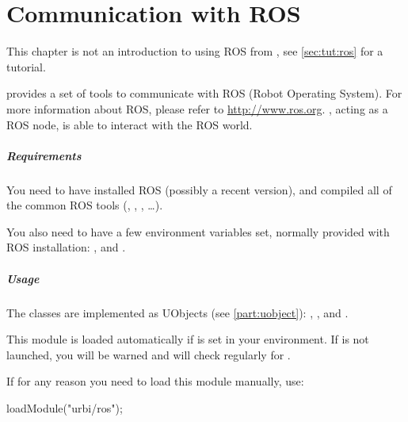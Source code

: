 
\chapter{Communication with ROS}
\label{sec:specs:ros}

This chapter is not an introduction to using ROS from \urbi, see
\autoref{sec:tut:ros} for a tutorial.

\urbi provides a set of tools to communicate with ROS (Robot Operating
System). For more information about ROS, please refer to
\url{http://www.ros.org}.  \urbi, acting as a ROS node, is able to interact
with the ROS world.


\paragraph{Requirements}

You need to have installed ROS (possibly a recent version), and compiled all
of the common ROS tools (, ,
, \ldots).

You also need to have a few environment variables set, normally provided
with ROS installation: ,  and
.


\paragraph{Usage}

The classes are implemented as UObjects (see \autoref{part:uobject}):
, , and .

This module is loaded automatically if  is set in
your environment. If  is not launched, you will be
warned and \urbi will check regularly for .

If for any reason you need to load this module manually, use:
\begin{urbiunchecked}
loadModule("urbi/ros");
\end{urbiunchecked}



